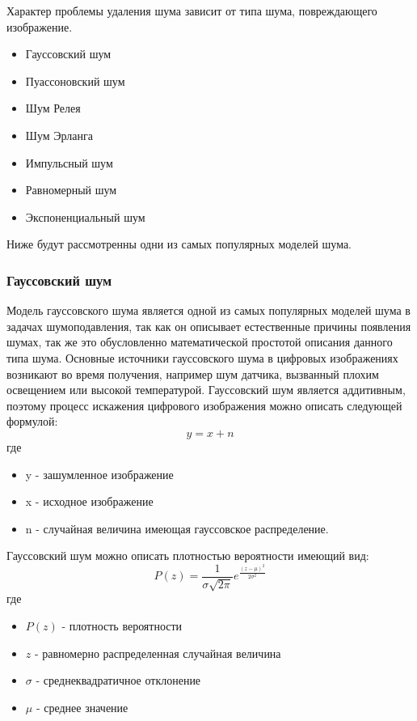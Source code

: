 Характер проблемы удаления шума зависит от типа шума, повреждающего изображение\cite{Gonzalez}. 
\begin{itemize}
	\item Гауссовский шум
	\item Пуассоновский шум
	\item Шум Релея
	\item Шум Эрланга
	\item Импульсный шум
	\item Равномерный шум
	\item Экспоненциальный шум
\end{itemize}

Ниже будут рассмотренны одни из самых популярных моделей шума.
\subsubsection{Гауссовский  шум}
Модель гауссовского шума является одной из самых популярных моделей шума в задачах шумоподавления, так как он описывает естественные причины появления шумах, так же это обусловленно математической простотой описания данного типа шума.
Основные источники гауссовского шума в цифровых изображениях возникают во время получения, например шум датчика, вызванный плохим освещением или высокой температурой.
Гауссовский шум является аддитивным, поэтому процесс искажения цифрового изображения можно описать следующей формулой:
\begin{equation}
	y = x + n
\end{equation}
где
\begin{itemize}
	\item y - зашумленное изображение 
	\item x - исходное изображение
	\item n - случайная величина имеющая гауссовское распределение.
\end{itemize}
Гауссовский шум можно описать плотностью вероятности имеющий вид\cite{gauss}:
\begin{equation}
	P(z)=\frac{1}{\sigma\sqrt{2\pi}}e^{\frac{(z-\mu)^2}{2\sigma^2}}
\end{equation}
где
\begin{itemize}
	\item $P(z)$ - плотность вероятности
	\item $z$ - равномерно распределенная случайная величина
	\item $\sigma$ - среднеквадратичное отклонение
	\item $\mu$ - среднее значение
\end{itemize}


